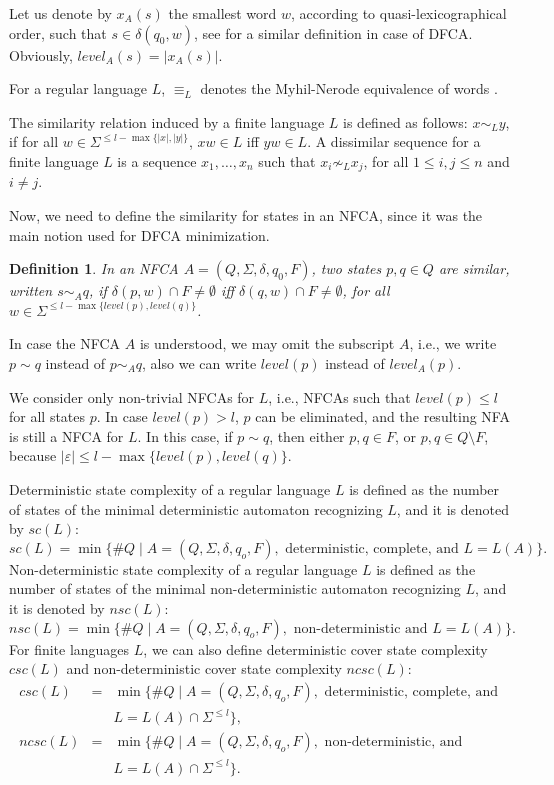 \documentclass[submission,copyright,creativecommons]{eptcs}
\newtheorem{definition}{Definition}
\begin{document}
Let us denote by $x_A(s)$ the smallest word $w$, according to quasi-lexicographical order, such that
$s\in \delta(q_0,w)$, see \cite{CoverAutomata} for a similar definition in case of DFCA.
Obviously,  $level_A(s)=|x_A(s)|$.

For a regular language $L$, $\equiv_L$ denotes the Myhil-Nerode equivalence of words \cite{hopcroft79}.

The similarity relation induced by a finite language $L$ is defined as follows\cite{CoverAutomata}:
$x\sim_L y$, if
for all $w\in \Sigma^{\leq l-\max\{|x|,|y|\}}$, $xw\in L$ iff $yw\in L$.
A dissimilar sequence for a finite language $L$ 
is a sequence $x_1,\ldots, x_n$ such that $x_i\not\sim_L x_j$, for all $1\leq i,j\leq n$
and
 $i\neq j$.


Now, we need to define the similarity for states in an NFCA, 
since it was the main notion used for DFCA minimization.

\begin{definition}
In an NFCA $A=(Q,\Sigma,\delta,q_0,F)$, two states $p,q\in Q$ are similar, written $s\sim_A q$,  if
$\delta(p,w)\cap F\neq \emptyset$ iff $\delta(q,w)\cap F\neq \emptyset$, 
for all $w\in \Sigma^{\leq l-\max\{level(p),level(q)\}}$.
\end{definition}

In case the NFCA $A$ is understood, we may omit the subscript $A$, i.e., we 
write $p\sim q$ instead of $p\sim_Aq$, also we can write $level(p)$ instead of $level_A(p)$.

We consider only non-trivial NFCAs for $L$, i.e., 
 NFCAs such that $level(p)\leq l$ for all states $p$. In case
$level(p)>l$, $p$ can be eliminated, and the resulting NFA is still a NFCA for $L$.
In this case, if $p\sim q$, then  either $p,q\in F$, or $p,q\in Q\setminus F$, because $|\varepsilon|\leq 
l-\max\{level(p),level(q)\}$.


Deterministic state complexity of a regular language $L$ is defined as the number of states of the minimal 
deterministic automaton recognizing $L$, and it is denoted by $sc(L)$:
$$
sc(L)=\min\{\#Q\mid A=(Q,\Sigma,\delta, q_o,F),\mbox{ deterministic, complete, and }L=L(A)\}.
$$ 
Non-deterministic state complexity of a regular language $L$ is defined as the number of states of the minimal 
non-deterministic automaton recognizing $L$, and it is denoted by $nsc(L)$:
$$
nsc(L)=\min\{\#Q\mid A=(Q,\Sigma,\delta, q_o,F), \mbox{ non-deterministic  and }L=L(A)\}.
$$ 
For finite  languages $L$, we can also define deterministic cover state complexity $csc(L)$
and non-deterministic cover state complexity $ncsc(L)$:
\begin{eqnarray*}
csc(L) & = & \min\{\#Q\mid A=(Q,\Sigma,\delta, q_o,F), \mbox{ deterministic, complete, and }\\
       &   & L=L(A)\cap \Sigma^{\leq l}\},\\
ncsc(L)& = & \min\{\#Q\mid A=(Q,\Sigma,\delta, q_o,F),\mbox{ non-deterministic,  and }\\
       &   & L=L(A)\cap \Sigma^{\leq l}\}. 
\end{eqnarray*}
\end{document}
